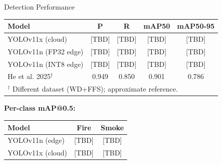 \documentclass[aspectratio=169,10pt]{beamer}
\begin{document}
\begin{frame}{Detection Performance}
  \begin{table}
    \centering\small
    \begin{tabular}{lcccc}
      \toprule
      \textbf{Model} & \textbf{P} & \textbf{R} & \textbf{mAP50} & \textbf{mAP50-95}\\
      \midrule
      YOLOv11x (cloud)      & [TBD] & [TBD] & [TBD] & [TBD] \\
      YOLOv11n (FP32 edge)  & [TBD] & [TBD] & [TBD] & [TBD] \\
      YOLOv11n (INT8 edge)  & [TBD] & [TBD] & [TBD] & [TBD] \\
      \midrule
      He et al. 2025$^\dagger$  & 0.949 & 0.850 & 0.901 & 0.786 \\
      \bottomrule
      \multicolumn{5}{l}{\tiny $^\dagger$ Different dataset (WD+FFS); approximate reference.}
    \end{tabular}
  \end{table}
  \vspace{0.4em}
  \textbf{Per-class mAP@0.5:}
  \begin{table}
    \centering\small
    \begin{tabular}{lcc}
      \toprule
      \textbf{Model} & \textbf{Fire} & \textbf{Smoke}\\
      \midrule
      YOLOv11n (edge) & [TBD] & [TBD]\\
      YOLOv11x (cloud)& [TBD] & [TBD]\\
      \bottomrule
    \end{tabular}
  \end{table}
\end{frame}
\end{document}
